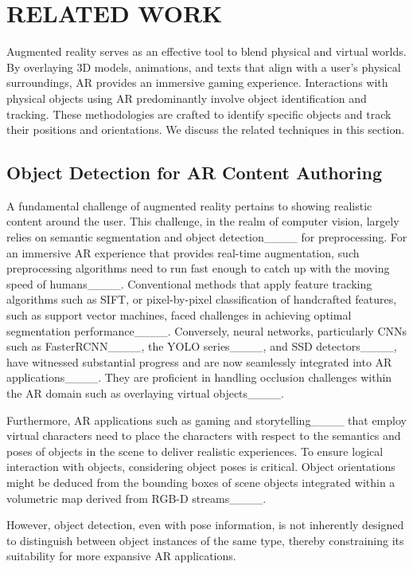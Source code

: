 \section{RELATED WORK}
Augmented reality serves as an effective tool to blend physical and virtual worlds. By overlaying 3D models, animations, and texts that align with a user's physical surroundings, AR provides an immersive gaming experience. Interactions with physical objects using AR predominantly involve object identification and tracking. These methodologies are crafted to identify specific objects and track their positions and orientations. We discuss the related techniques in this section.


\subsection{Object Detection for AR Content Authoring}
A fundamental challenge of augmented reality pertains to showing realistic content around the user. This challenge, in the realm of computer vision, largely relies on semantic segmentation and object detection____ for preprocessing. For an immersive AR experience that provides real-time augmentation, such preprocessing algorithms need to run fast enough to catch up with the moving speed of humans____. Conventional methods that apply feature tracking algorithms such as SIFT, or pixel-by-pixel classification of handcrafted features, such as support vector machines, faced challenges in achieving optimal segmentation performance____. Conversely, neural networks, particularly CNNs such as FasterRCNN____, the YOLO series____, and SSD detectors____, have witnessed substantial progress and are now seamlessly integrated into AR applications____. They are proficient in handling occlusion challenges within the AR domain such as overlaying virtual objects____. 

Furthermore, AR applications such as gaming and storytelling____ that employ virtual characters need to place the characters with respect to the semantics and poses of objects in the scene to deliver realistic experiences. To ensure logical interaction with objects, considering object poses is critical. Object orientations might be deduced from the bounding boxes of scene objects integrated within a volumetric map derived from RGB-D streams____. 

However, object detection, even with pose information, is not inherently designed to distinguish between object instances of the same type, thereby constraining its suitability for more expansive AR applications.

